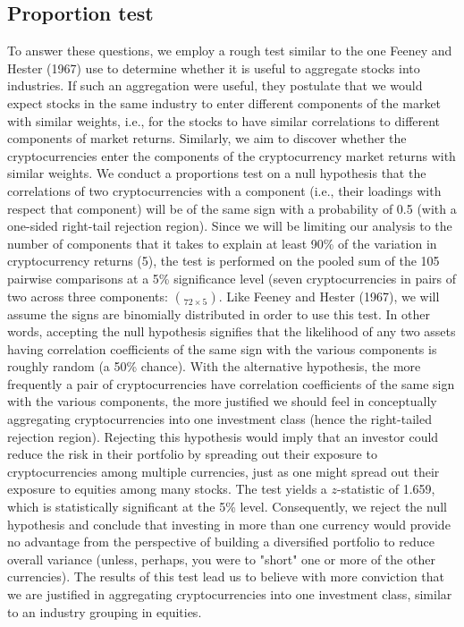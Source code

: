 \documentclass[12pt,twoside]{article}
\begin{document}
\subsection*{Proportion test}
To answer these questions, we employ a rough test similar to the one Feeney and Hester (1967) use to determine whether it is useful to aggregate stocks into industries. If such an aggregation were useful, they postulate that we would expect stocks in the same industry to enter different components of the market with similar weights, i.e., for the stocks to have similar correlations to different components of market returns. Similarly, we aim to discover whether the cryptocurrencies enter the components of the cryptocurrency market returns with similar weights. We conduct a proportions test on a null hypothesis that the correlations of two cryptocurrencies with a component (i.e., their loadings with respect that component) will be of the same sign with a probability of 0.5 (with a one-sided right-tail rejection region). Since we will be limiting our analysis to the number of components that it takes to explain at least 90\% of the variation in cryptocurrency returns (5), the test is performed on the pooled sum of the 105 pairwise comparisons at a 5\% significance level (seven cryptocurrencies in pairs of two across three components: $\choose{7}{2} \times 5$. Like Feeney and Hester (1967), we will assume the signs are binomially distributed in order to use this test.
\bigbreak
In other words, accepting the null hypothesis signifies that the likelihood of any two assets having correlation coefficients of the same sign with the various components is roughly random (a 50\% chance). With the alternative hypothesis, the more frequently a pair of cryptocurrencies have correlation coefficients of the same sign with the various components, the more justified we should feel in conceptually aggregating cryptocurrencies into one investment class (hence the right-tailed rejection region). Rejecting this hypothesis would imply that an investor could reduce the risk in their portfolio by spreading out their exposure to cryptocurrencies among multiple currencies, just as one might spread out their exposure to equities among many stocks. The test yields a $z$-statistic of 1.659, which is statistically significant at the 5\% level. Consequently, we reject the null hypothesis and conclude that investing in more than one currency would provide no advantage from the perspective of building a diversified portfolio to reduce overall variance (unless, perhaps, you were to "short" one or more of the other currencies). The results of this test lead us to believe with more conviction that we are justified in aggregating cryptocurrencies into one investment class, similar to an industry grouping in equities.
\end{document}
